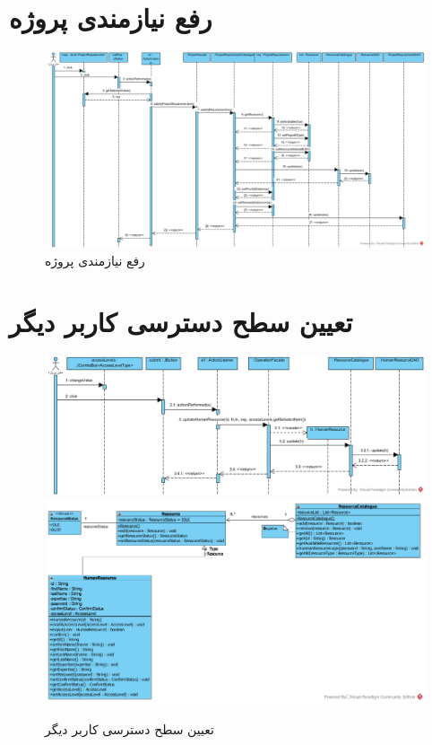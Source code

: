 \begin{landscape}
\newpage
\section{رفع نیازمندی پروژه}
\begin{figure}[H]
	\centering
	\includegraphics[scale=0.5]{img/sequence-design/SatisfyResourceOfProject}
	\caption{رفع نیازمندی پروژه}
\end{figure}

\newpage
\section{تعیین سطح دسترسی کاربر دیگر}
\begin{figure}[H]
	\centering
	\includegraphics[scale=0.55]{img/sequence-design/SetUserAccessLevel}
	\includegraphics[scale=0.6]{img/sequence-design/SetUserAccessLevelC}
	\caption{تعیین سطح دسترسی کاربر دیگر}
\end{figure}


\end{landscape}

